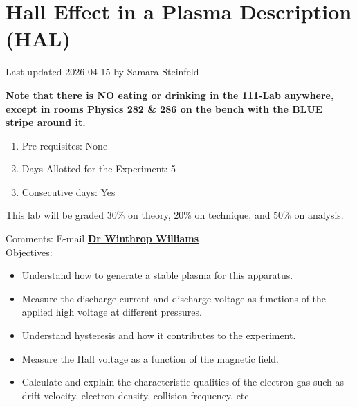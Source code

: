 \documentclass{../lab}
\begin{document}
\maketitle

\tableofcontents

\newpage

\section{Hall Effect in a Plasma Description (HAL)}

Last updated 2026-04-15 by Samara Steinfeld

\textbf{Note that there is NO eating or drinking in the 111-Lab anywhere, except in rooms Physics 282 \& 286 on the bench with the BLUE stripe around it.}

\begin{enumerate}
    \item Pre-requisites: None

    \item Days Allotted for the Experiment: 5

    \item Consecutive days: Yes

\end{enumerate}

This lab will be graded 30\% on theory, 20\% on technique, and 50\% on analysis.

Comments: E-mail \href{\MailLabManager}{\textbf{Dr Winthrop Williams}}\\

Objectives:
\begin{itemize}
    \item Understand how to generate a stable plasma for this apparatus.

    \item Measure the discharge current and discharge voltage as functions of the applied high voltage at different pressures.

    \item Understand hysteresis and how it contributes to the experiment.

    \item Measure the Hall voltage as a function of the magnetic field.

    \item Calculate and explain the characteristic qualities of the electron gas such as drift velocity, electron density, collision frequency, etc.

\end{itemize}
\end{document}
